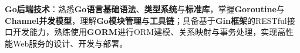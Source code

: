 \item \textbf{Go后端技术}：熟悉\textbf{Go语言基础语法}、\textbf{类型系统}与\textbf{标准库}，掌握\textbf{Goroutine}与\textbf{Channel并发模型}，理解\textbf{Go模块管理}与\textbf{工具链}；具备基于\textbf{Gin框架}的RESTful接口开发能力，熟练使用\textbf{GORM}进行ORM建模、关系映射与事务处理，实现高性能Web服务的设计、开发与部署。